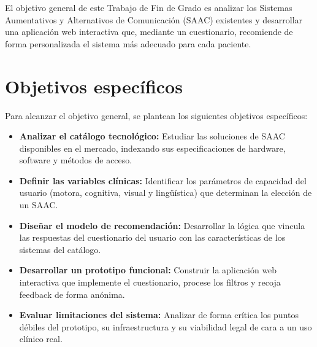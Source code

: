 
El objetivo general de este Trabajo de Fin de Grado es analizar los Sistemas Aumentativos y Alternativos de Comunicación (SAAC) existentes y desarrollar una aplicación web interactiva que, mediante un cuestionario, recomiende de forma personalizada el sistema más adecuado para cada paciente.

\section{Objetivos específicos}
Para alcanzar el objetivo general, se plantean los siguientes objetivos específicos:
\begin{itemize}
    	\item \textbf{Analizar el catálogo tecnológico:} Estudiar las soluciones de SAAC disponibles en el mercado, indexando sus especificaciones de hardware, software y métodos de acceso.
    	\item \textbf{Definir las variables clínicas:} Identificar los parámetros de capacidad del usuario (motora, cognitiva, visual y lingüística) que determinan la elección de un SAAC.
    	\item \textbf{Diseñar el modelo de recomendación:} Desarrollar la lógica que vincula las respuestas del cuestionario del usuario con las características de los sistemas del catálogo.
    	\item \textbf{Desarrollar un prototipo funcional:} Construir la aplicación web interactiva que implemente el cuestionario, procese los filtros y recoja feedback de forma anónima.
    	\item \textbf{Evaluar limitaciones del sistema:} Analizar de forma crítica los puntos débiles del prototipo, su infraestructura y su viabilidad legal de cara a un uso clínico real.
\end{itemize}

